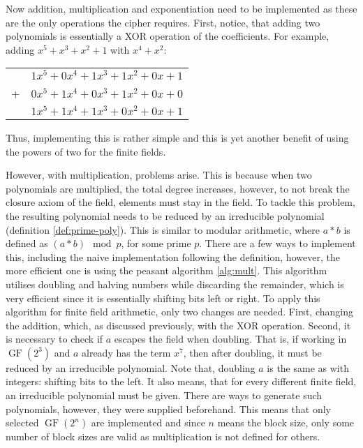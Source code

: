 \documentclass{Resources/UoBLab1}
\theoremstyle{definition}
\begin{document}
Now addition, multiplication and exponentiation need to be implemented as these are the only operations the cipher requires. First, notice, that adding two polynomials is essentially a XOR operation of the coefficients. For example, adding $x^5 + x^3 + x^2 + 1$ with $x^4 + x^2$:
\begin{table}[h]
    \centering
    \begin{tabular}{l r}
        & $1x^5 + 0x^4 + 1x^3 + 1x^2 + 0x + 1$ \\
        +& $0x^5 + 1x^4 + 0x^3 + 1x^2 + 0x + 0$ \\
        \hline
        & $1x^5 + 1x^4 + 1x^3 + 0x^2 + 0x + 1$
    \end{tabular}
\end{table}

Thus, implementing this is rather simple and this is yet another benefit of using the powers of two for the finite fields.

However, with multiplication, problems arise. This is because when two polynomials are multiplied, the total degree increases, however, to not break the closure axiom of the field, elements must stay in the field. To tackle this problem, the resulting polynomial needs to be reduced by an irreducible polynomial (definition \ref{def:prime-poly}). This is similar to modular arithmetic, where $a * b$ is defined as $(a * b) \mod p$, for some prime $p$. There are a few ways to implement this, including the naive implementation following the definition, however, the more efficient one is using the peasant algorithm \ref{alg:mult}. This algorithm utilises doubling and halving numbers while discarding the remainder, which is very efficient since it is essentially shifting bits left or right. To apply this algorithm for finite field arithmetic, only two changes are needed. First, changing the addition, which, as discussed previously, with the XOR operation. Second, it is necessary to check if $a$ escapes the field when doubling. That is, if working in $\operatorname{GF}(2^3)$ and $a$ already has the term $x^7$, then after doubling, it must be reduced by an irreducible polynomial. Note that, doubling $a$ is the same as with integers: shifting bits to the left. It also means, that for every different finite field, an irreducible polynomial must be given. There are ways to generate such polynomials, however, they were supplied beforehand. This means that only selected $\operatorname{GF}(2^n)$ are implemented and since $n$ means the block size, only some number of block sizes are valid as multiplication is not defined for others.
\end{document}
